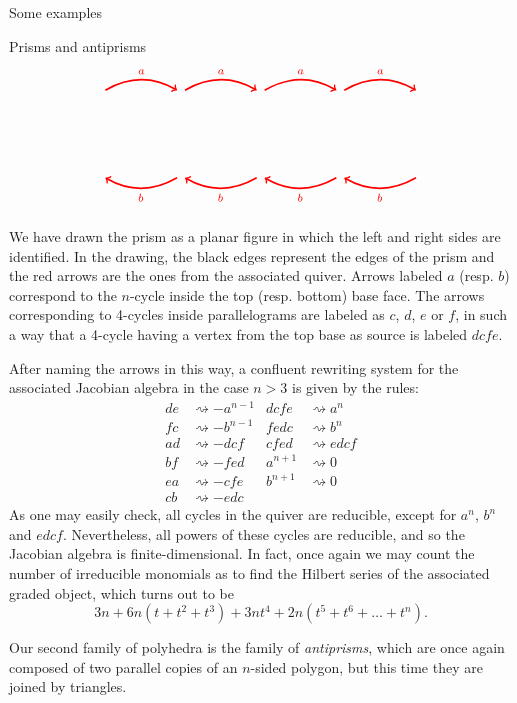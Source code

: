 \begin{chapter}{Some examples}
\begin{section}{Prisms and antiprisms}
\[\begin{tikzpicture}[text width=1.5mm, font=\footnotesize]
\foreach \x in {-4,-2,...,2}
{
\draw[->, red, very thick] (\x+0.1, 2.1) to [bend left] node[above]{$a$} (\x+1.9, 2.1);
\draw[<-, red, very thick] (\x+0.1, -0.1) to [bend right] node[below]{$b$} (\x+1.9, -0.1);
}
\end{tikzpicture}
\]

We have drawn the prism as a planar figure in which the left and right sides are identified. In the drawing, the black edges represent the edges of the prism and the red arrows are the ones from the associated quiver. Arrows labeled $a$ (resp. $b$) correspond to the $n$-cycle inside the top (resp. bottom) base face. The arrows corresponding to 4-cycles inside parallelograms are labeled as $c$, $d$, $e$ or $f$, in such a way that a 4-cycle having a vertex from the top base as source is labeled $dcfe$.

After naming the arrows in this way, a confluent rewriting system for the associated Jacobian algebra in the case $n>3$ is given by the rules:
\begin{align*}
de &\rightsquigarrow -a^{n-1} 	& dcfe &\rightsquigarrow a^n \\
fc &\rightsquigarrow -b^{n-1}	& fedc &\rightsquigarrow b^n \\
ad &\rightsquigarrow -dcf		& cfed &\rightsquigarrow edcf \\
bf &\rightsquigarrow -fed  	& a^{n+1} &\rightsquigarrow 0 \\
ea &\rightsquigarrow -cfe 		& b^{n+1} &\rightsquigarrow 0 \\
cb &\rightsquigarrow -edc  	& \, & \,
\end{align*}
As one may easily check, all cycles in the quiver are reducible, except for $a^n$, $b^n$ and $edcf$. Nevertheless, all powers of these cycles are reducible, and so the Jacobian algebra is finite-dimensional. In fact, once again we may count the number of irreducible monomials as to find the Hilbert series of the associated graded object, which turns out to be
\[3n + 6n(t+t^2+t^3) + 3nt^4 + 2n(t^5+t^6+\dots+t^n).\]

Our second family of polyhedra is the family of \emph{antiprisms}, which are once again composed of two parallel copies of an $n$-sided polygon, but this time they are joined by triangles.


\end{section}
\end{chapter}
